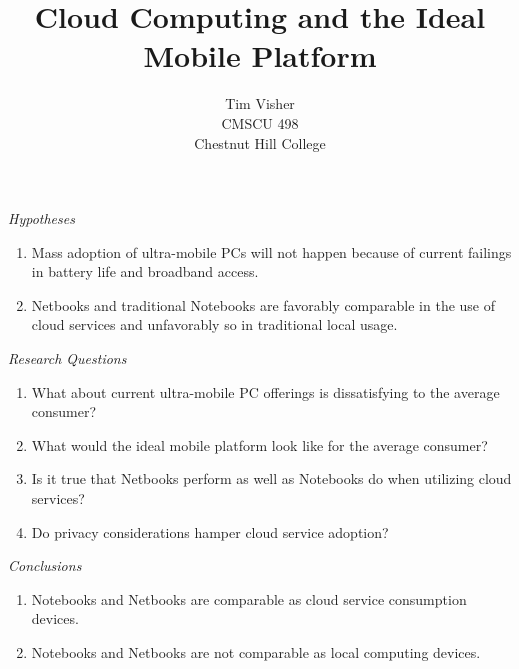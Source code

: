 \documentclass[letterpaper]{article}
\author{Tim Visher\\ CMSCU 498\\ Chestnut Hill College}
\title{Cloud Computing and the Ideal Mobile Platform}
\begin{document}
\Huge{
\begin{center}
  \emph{Hypotheses}
\end{center}

\begin{enumerate}

\item Mass adoption of ultra-mobile PCs will not happen because of current
  failings in battery life and broadband access.

\item Netbooks and traditional Notebooks are favorably comparable in the use of
  cloud services and unfavorably so in traditional local usage.

\end{enumerate}

\begin{center}

\begin{center}

  \emph{Research Questions}

\end{center}

\begin{enumerate}

\item What about current ultra-mobile PC offerings is dissatisfying to the
  average consumer?

\item What would the ideal mobile platform look like for the average consumer?

\item Is it true that Netbooks perform as well as Notebooks do when utilizing cloud services?

\item Do privacy considerations hamper cloud service adoption?

\end{enumerate}

\newpage

\begin{center}

  \emph{Conclusions}

\end{center}

\begin{enumerate}

\item Notebooks and Netbooks are comparable as cloud service consumption
  devices.

\item Notebooks and Netbooks are not comparable as local computing devices.


\end{enumerate}
\end{center}}
\end{document}
